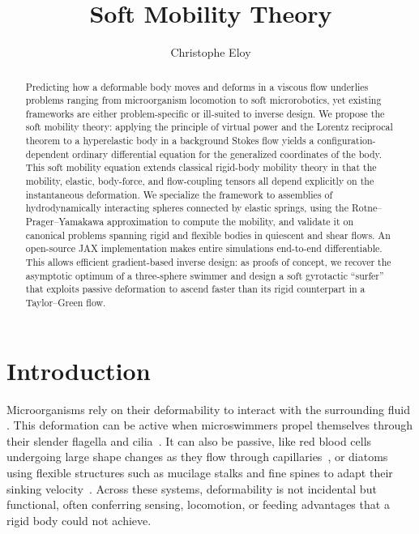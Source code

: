 \documentclass[aps,prfluids,groupedaddress]{revtex4-2}
\begin{document}
\title{Soft Mobility Theory}

\author{Christophe Eloy}


\begin{abstract}
Predicting how a deformable body moves and deforms in a viscous flow underlies problems ranging from microorganism locomotion to soft microrobotics, yet existing frameworks are either problem-specific or ill-suited to inverse design. We propose the soft mobility theory: applying the principle of virtual power and the Lorentz reciprocal theorem to a hyperelastic body in a background Stokes flow yields a configuration-dependent ordinary differential equation for the generalized coordinates of the body. This soft mobility equation extends classical rigid-body mobility theory in that the mobility, elastic, body-force, and flow-coupling tensors all depend explicitly on the instantaneous deformation. We specialize the framework to assemblies of hydrodynamically interacting spheres connected by elastic springs, using the Rotne--Prager--Yamakawa approximation to compute the mobility, and validate it on canonical problems spanning rigid and flexible bodies in quiescent and shear flows. An open-source JAX implementation makes entire simulations end-to-end differentiable. This allows efficient gradient-based inverse design: as proofs of concept, we recover the asymptotic optimum of a three-sphere swimmer and design a soft gyrotactic ``surfer'' that exploits passive deformation to ascend faster than its rigid counterpart in a Taylor–Green flow.
\end{abstract}

\maketitle

\section{Introduction\label{sec.intro}}

Microorganisms rely on their deformability to interact with the surrounding fluid \cite{Visser2001,Wheeler2019}. 
This deformation can be active when microswimmers propel themselves through their slender flagella and cilia~\cite{Lauga2009,Lauga2016,Lauga2020,Guasto2012,Wheeler2019}. It can also be passive, like red blood cells undergoing large shape changes as they flow through capillaries~\cite{BarthesBiesel2016,Farutin2013}, or diatoms using flexible structures such as mucilage stalks and fine spines to adapt their sinking velocity~\cite{Smayda1974,Wiseman1981,Padisak2003}. 
Across these systems, deformability is not incidental but functional, often conferring sensing, locomotion, or feeding advantages that a rigid body could not achieve.
\end{document}
